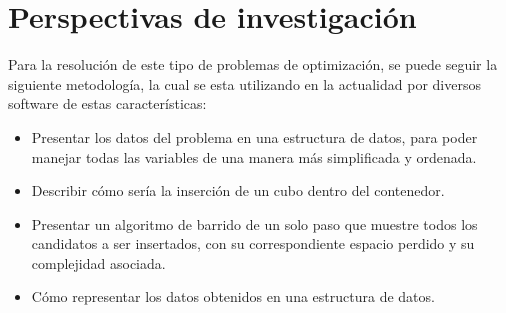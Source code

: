 \section{Perspectivas de investigación\label{sec:perspectivas}}

Para la resolución de este tipo de problemas de optimización, se puede seguir la siguiente
metodología, la cual se esta utilizando en la actualidad por diversos software de
estas características:

\begin{itemize}
\item Presentar los datos del problema en una estructura de datos, para poder manejar
      todas las variables de una manera más simplificada y ordenada.
\item Describir cómo sería la inserción de un cubo dentro del contenedor.
\item Presentar un algoritmo de barrido de un solo paso que muestre todos los candidatos
      a ser insertados, con su correspondiente espacio perdido y su complejidad asociada.
\item Cómo representar los datos obtenidos en una estructura de datos.
\end{itemize}

